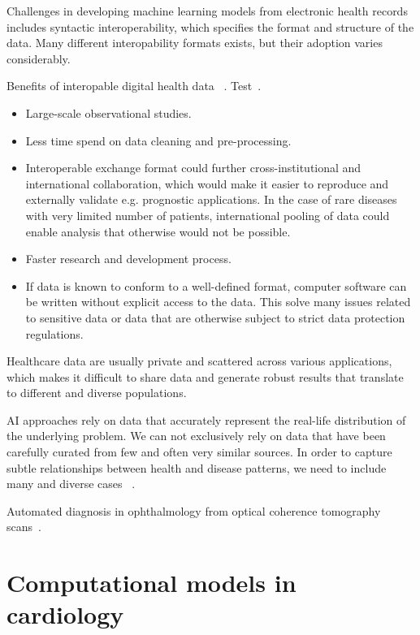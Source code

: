 Challenges in developing machine learning models from electronic health records
includes syntactic interoperability, 
which specifies the format and structure of the data.
Many different interopability formats exists, 
but their adoption varies considerably.

Benefits of interopable digital health data
~\autocite{lehneWhy2019}.
Test~\cite{lehneWhy2019}.

\begin{itemize}
    \item Large-scale observational studies.
    \item Less time spend on data cleaning and pre-processing.
    \item Interoperable exchange format could further cross-institutional
    and international collaboration, which would make it easier 
    to reproduce and externally validate e.g. prognostic applications.
    In the case of rare diseases with very limited number of patients, 
    international pooling of data could enable analysis
    that otherwise would not be possible.
    \item Faster research and development process.
    \item If data is known to conform to a well-defined format,
    computer software can be written without explicit access to the data.
    This solve many issues related to sensitive data or
    data that are otherwise subject to strict data protection regulations.
\end{itemize}


Healthcare data are usually private and scattered across various applications,
which makes it difficult to share data and generate robust results 
that translate to different and diverse populations.

AI approaches rely on data that accurately represent
the real-life distribution of the underlying problem.
We can not exclusively rely on data that have been carefully curated 
from few and often very similar sources. 
In order to capture subtle relationships 
between health and disease patterns,
we need to include many and diverse cases~%
\autocite{riekeFuture2020}.

Automated diagnosis in ophthalmology 
from optical coherence tomography scans~\autocite{defauwClinically2018}.

\section{Computational models in cardiology}

